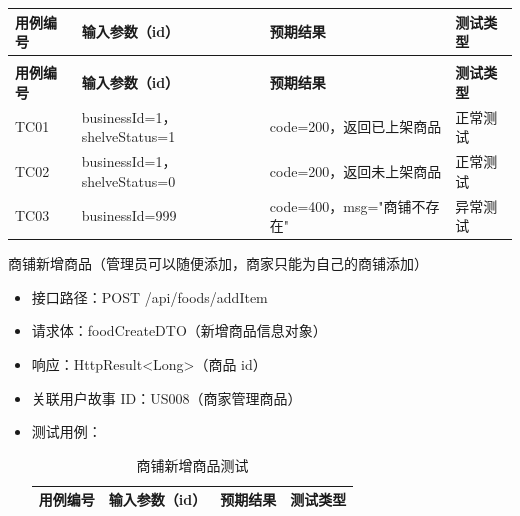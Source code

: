\begin{levellist}
\begin{levellist}
\begin{itemize}
\begin{longtable}{>{\centering\arraybackslash}m{1.7cm} >{\centering\arraybackslash}m{3cm} >{\centering\arraybackslash}m{6.3cm} >{\centering\arraybackslash}m{2cm}}
                      \toprule
                      \textbf{用例编号} & \textbf{输入参数（id）}           & \textbf{预期结果}        & \textbf{测试类型} \\
                      \midrule
                      \endfirsthead

                      \multicolumn{4}{c}{{\tablename\ \thetable{} 续表}}                                   \\
                      \toprule
                      \textbf{用例编号} & \textbf{输入参数（id）}           & \textbf{预期结果}        & \textbf{测试类型} \\
                      \midrule
                      \endhead

                      \bottomrule
                      \endfoot


                      TC01          & businessId=1，shelveStatus=1 & code=200，返回已上架商品     & 正常测试          \\
                      TC02          & businessId=1，shelveStatus=0 & code=200，返回未上架商品     & 正常测试          \\
                      TC03          & businessId=999              & code=400，msg="商铺不存在" & 异常测试          \\
                  \end{longtable}
        \end{itemize}

        \item 商铺新增商品（管理员可以随便添加，商家只能为自己的商铺添加）
        \begin{itemize}
            \item 接口路径：POST /api/foods/addItem
            \item 请求体：foodCreateDTO（新增商品信息对象）
            \item 响应：HttpResult<Long>（商品 id）
            \item 关联用户故事 ID：US008（商家管理商品）
            \item 测试用例：
                  \begin{longtable}{>{\centering\arraybackslash}m{1.7cm} >{\centering\arraybackslash}m{3cm} >{\centering\arraybackslash}m{6.3cm} >{\centering\arraybackslash}m{2cm}}

                      \caption{商铺新增商品测试} \label{tab:training}                                 \\

                      \toprule
                      \textbf{用例编号} & \textbf{输入参数（id）} & \textbf{预期结果}       & \textbf{测试类型} \\
                      \midrule
                      \endfirsthead


\end{longtable}
\end{itemize}
\end{levellist}
\end{levellist}
